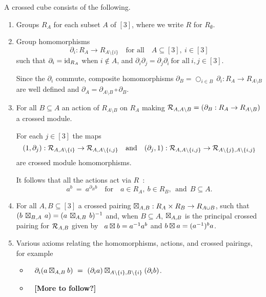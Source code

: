 \begin{defn}
A crossed cube consists of the following.
\begin{enumerate}[{\rm (i)}]
\item
Groups  $R_A$  for each subset  $A$  of  $[3]$,
where we write $R$ for $R_{\emptyset}$.

\item
Group homomorphisms
$$
\partial_i : R_A \to R_{A \setminus \{i\}}  \quad\mbox{for all} \quad 
A \subseteq [3],~ i \in [3]
$$
such that  $\partial_i = \mathrm{id}_{R_A}$  when  $i \notin A$, and  
$\partial_i\partial_j = \partial_j\partial_i ~\mbox{for all}~ i,j \in [3]$.

\noindent
Since the $\partial_i$ commute, composite homomorphisms
$\partial_B = \bigcirc_{i \in B}\,\partial_i : R_A \to R_{A \setminus B}$ 
are well defined and 
$\partial_A = \partial_{A \setminus B} \circ \partial_B$. 

\item
For all $B \subseteq A$ an action of $R_{A \setminus B}$ on $R_A$
making $\mathcal{R}_{A,A \setminus B} = (\partial_B : R_A \to R_{A \setminus B})$
a crossed module.

For each $j \in [3]$ the maps 
$$
(1,\partial_j) : \mathcal{R}_{A,A \setminus \{i\}} \to 
\mathcal{R}_{A,A \setminus \{i,j\}}
\quad\mbox{and}\quad
(\partial_j,1) : \mathcal{R}_{A,A \setminus \{i,j\}} \to 
\mathcal{R}_{A \setminus \{j\},A \setminus \{i,j\}}
$$
are crossed module homomorphisms.

It follows that all the actions act via $R$~:
$$
a^b ~=~ a^{\partial_B b} \quad\mbox{for}\quad
a \in R_A,~ b \in R_B, ~~\mbox{and}~~ B \subseteq A.
$$

\item
For all  $A,B \subseteq [3]$  a crossed pairing 
$\boxtimes_{A,B} : R_A \times R_B \to R_{A \cup B}$,
such that
$(b\,\boxtimes_{B,A}\,a) = (a\,\boxtimes_{A,B}\,b)^{-1}$  and, when $B \subseteq A$,
$\boxtimes_{A,B}$  is the principal crossed pairing for $\mathcal{R}_{A,B}$ 
given by ~$a \boxtimes b = a^{-1}a^b$ and $b \boxtimes a = (a^{-1})^ba$.

\item
Various axioms relating the homomorphisms, actions, and crossed pairings, 
for example
\begin{itemize}
\item~ $\partial_i(a \boxtimes_{A,B} b) ~=~ 
        (\partial_i a) \boxtimes_{A\setminus\{i\},B\setminus\{i\}} (\partial_i b)$.
\item~ {\bf [More to follow?]}
\end{itemize}
\end{enumerate}
\end{defn}

